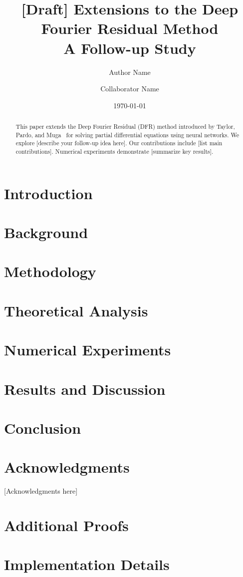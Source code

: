 \documentclass[11pt,a4paper]{article}
\title{%
  [Draft] Extensions to the Deep Fourier Residual Method\\
  \large A Follow-up Study
}
\author[1]{Author Name}
\author[2]{Collaborator Name}
\affil[1]{Institution 1}
\affil[2]{Institution 2}
\date{\today}
\begin{document}
\maketitle

\begin{abstract}
This paper extends the Deep Fourier Residual (DFR) method introduced by Taylor, Pardo, and Muga~\cite{taylor2023deep} for solving partial differential equations using neural networks. We explore [describe your follow-up idea here]. Our contributions include [list main contributions]. Numerical experiments demonstrate [summarize key results].
\end{abstract}

\section{Introduction}
\label{sec:introduction}


\section{Background}
\label{sec:background}


\section{Methodology}
\label{sec:methodology}


\section{Theoretical Analysis}
\label{sec:theory}


\section{Numerical Experiments}
\label{sec:experiments}


\section{Results and Discussion}
\label{sec:results}


\section{Conclusion}
\label{sec:conclusion}


\section*{Acknowledgments}
[Acknowledgments here]



\appendix
\section{Additional Proofs}
\label{app:proofs}

\section{Implementation Details}
\label{app:implementation}
\end{document}
